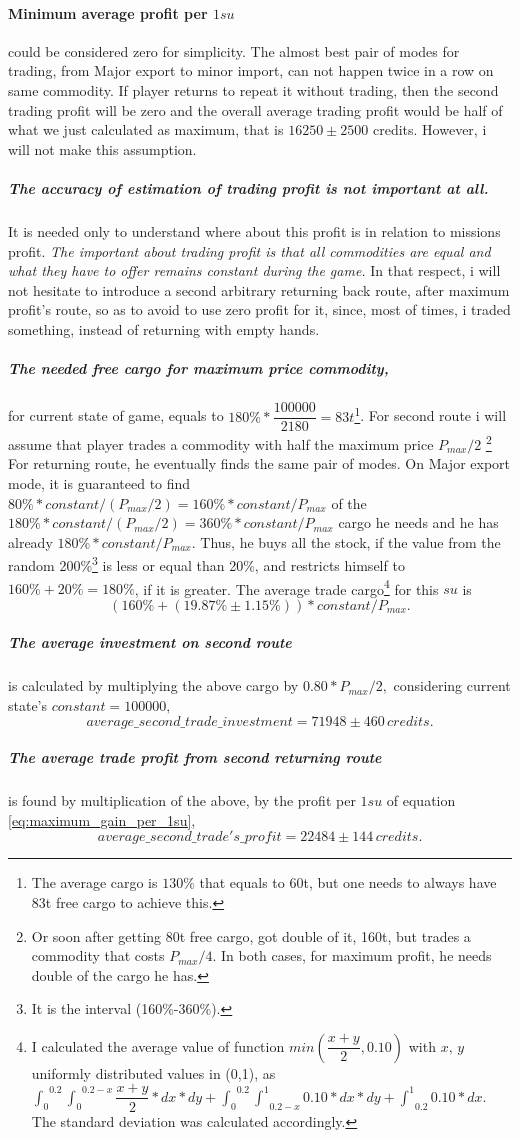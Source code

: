 \documentclass[]{article}
\begin{document}
 \paragraph{Minimum average profit per $1su$} could be considered zero for simplicity. The almost best pair of modes for trading, from Major export to minor import, can not happen twice in a row on same commodity. If player returns to repeat it without trading, then the second trading profit will be zero and the overall average trading profit would be half of what we just calculated as maximum, that is $16250\pm2500$ credits. However, i will not make this assumption.
 \subparagraph{The accuracy of estimation of trading profit is not important at all.} It is needed only to understand where about this profit is in relation to missions profit. \emph{The important about trading profit is that all commodities are equal and what they have to offer remains constant during the game.} In that respect, i will not hesitate to introduce a second arbitrary returning back route, after maximum profit's route, so as to avoid to use zero profit for it, since, most of times, i traded something, instead of returning with empty hands.
 \subparagraph*{The needed free cargo for maximum price commodity,} for current state of game, equals to $180\%*\dfrac{100000}{2180}=83t$\footnote{The average cargo is $130\%$ that equals to 60t, but one needs to always have 83t free cargo to achieve this.}. For second route i will assume that player trades a commodity with half the maximum price $P_{max}/2$ \footnote{Or soon after getting 80t free cargo, got double of it, 160t,  but trades a commodity that costs $P_{max}/4.$ In both cases, for maximum profit, he needs double of the cargo he has.} For returning route, he eventually finds the same pair of modes. On Major export mode, it is guaranteed to find $80\%*constant/(P_{max}/2)=160\%*constant/P_{max}$ of the $180\%*constant/(P_{max}/2)=360\%*constant/P_{max}$ cargo he needs and  he has already $180\%*constant/P_{max}$. Thus, he buys all the stock, if the value from the random 200\%\footnote{It is the interval (160\%-360\%).} is less or equal than 20\%, and restricts himself to $160\%+20\%=180\%$, if it is greater.  The average trade cargo\footnote{I calculated the average value of function $min(\dfrac{x+y}{2},0.10)$ with $x,\,y$ uniformly distributed values in (0,1), as ${\int_0}^{0.2}{\int_0}^{0.2-x}\dfrac{x+y}{2}*dx*dy+{\int_0}^{0.2}{\int^1}_{0.2-x} 0.10*dx*dy+{\int^1}_{0.2}0.10*dx.$ The standard deviation was calculated accordingly.} for this $su$ is
 \[(160\%+(19.87\%\pm1.15\%))*constant/P_{max}.\] 
 \subparagraph*{The average investment on second route} is calculated by multiplying the above cargo by $0.80*P_{max}/2,$ considering current state's $constant=100000,$
  \[
 	average\_second\_trade\_investment=71948\pm460\,credits.
 \]
\subparagraph{The average trade profit from second returning route} is found by multiplication of the above, by the profit per $1su$ of equation \eqref{eq:maximum_gain_per_1su},
\[average\_second\_trade's\_profit=22484\pm144\,credits.\]
\end{document}
